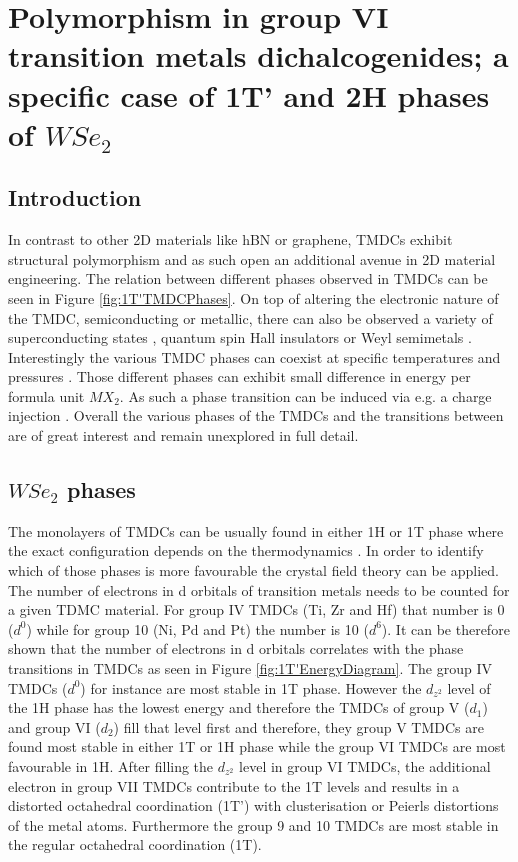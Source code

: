 \chapter{Polymorphism in group VI transition metals dichalcogenides; a specific case of 1T' and 2H phases of $WSe_2$}

\section{Introduction}
In contrast to other 2D materials like hBN or graphene, TMDCs exhibit structural polymorphism and as such open an additional avenue in 2D material engineering. The relation between different phases observed in TMDCs can be seen in Figure \ref{fig:1T'TMDCPhases}. On top of altering the electronic nature of the TMDC, semiconducting or metallic, there can also be observed a variety of superconducting states \cite{Saito2015}\cite{Lu2015}, quantum spin Hall insulators \cite{Qian2014}\cite{Choe2016}\cite{Liu2016a}\cite{Fei2017} or Weyl semimetals \cite{Sun2015}. Interestingly the various TMDC phases can coexist at specific temperatures and pressures \cite{Kappera2014}\cite{Keum2015}\cite{Cho2015}. Those different phases can exhibit small difference in energy per formula unit $MX_2$. As such a phase transition can be induced via e.g. a charge injection \cite{Duerloo2014}. Overall the various phases of the TMDCs and the transitions between are of great interest and remain unexplored in full detail.

\section{$WSe_2$ phases}
The monolayers of TMDCs can be usually found in either 1H or 1T phase where the exact configuration depends on the thermodynamics \cite{Keum2015}\cite{Cho2015}. In order to identify which of those phases is more favourable the crystal field theory can be applied. The number of electrons in d orbitals of transition metals needs to be counted for a given TDMC material. For group IV TMDCs (Ti, Zr and Hf) that number is 0 ($d^0$) while for group 10 (Ni, Pd and Pt) the number is 10 ($d^6$). It can be therefore shown that the number of electrons in d orbitals correlates with the phase transitions in TMDCs as seen in Figure \ref{fig:1T'EnergyDiagram}. The group IV TMDCs ($d^0$) for instance are most stable in 1T phase. However the $d_{z^2}$ level of the 1H phase has the lowest energy and therefore the TMDCs of group V ($d_1$) and group VI ($d_2$) fill that level first and therefore, they group V TMDCs are found most stable in  either 1T or 1H phase while the group VI TMDCs are most favourable in 1H. After filling the $d_{z^2}$ level in group VI TMDCs, the additional electron in group VII TMDCs contribute to the 1T levels and results in a distorted octahedral coordination (1T') with clusterisation or Peierls distortions of the metal atoms. Furthermore the group 9 and 10 TMDCs are most stable in the regular octahedral coordination (1T).

